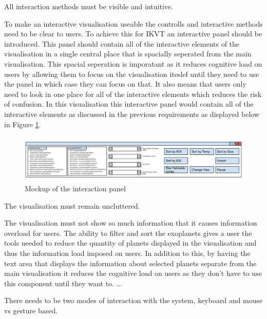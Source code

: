 \begin{enumerate}


{\bf \item[R6.] All interaction methods must be visible and intuitive.}

To make an interactive visualisation useable the controlls and interactive
methods need to be clear to users. To achieve this for IKVT an interactive panel
should be introduced. This panel should contain all of the interactive elements
of the visualisation in a single central place that is spacially seperated from
the main visualisation. This spacial seperation is imporatant as it reduces
cognitive load on users by allowing them to focus on the visualisation iteslef
until they need to use the panel in which case they can focus on that. It also
means that users only need to look in one place for all of the interactive
elements which reduces the risk of confusion. In this visualisation this
interactive panel would contain all of the interactive elements as discussed in
the previous requirements as displayed below in Figure
\ref{fig:interactionPanelMock}.

\begin{figure}[H]
  \centering
      \includegraphics[width=1\textwidth]{images/allTogether.png}
  \caption{Mockup of the interaction panel}  
  \label{fig:interactionPanelMock}
\end{figure}

\clearpage
{\bf \item[R7.] The visualisation must remain uncluttered.}

The visualisation must not show so much information that it
causes information overload for users. The ability to filter and sort the
exoplanets gives a user the tools needed to
reduce the quantity of planets displayed in the visualisation and thus the
information load imposed on users. In addition to this, by having the text area
that displays the information about
selected planets separate from the main visualisation it reduces the cognitive
load on users as they don't have to use this component until they want to. ...~

\clearpage
{\bf  \item[R8.] There needs to be two modes of interaction with the system,
keyboard and mouse vs gesture based.}


\end{enumerate}
